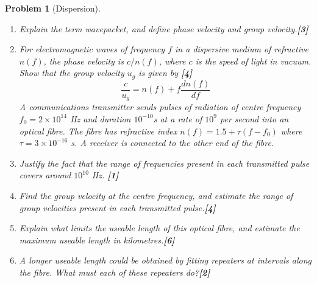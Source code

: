 \documentclass[a4paper]{article}
\theoremstyle{new}
\newtheorem{qns}{Problem}[subsection]
\begin{document}
\newpage
\begin{qns}[Dispersion]\leavevmode
\begin{enumerate}[label=(\roman*)]
\item Explain the term wavepacket, and define phase velocity and group velocity.\hfill\textbf{[3]}
\item For electromagnetic waves of frequency $f$ in a dispersive medium of refractive $n(f)$, the phase velocity is $c/n(f)$, where $c$ is the speed of light in vacuum. Show that the group velocity $u_g$ is given by \hfill\textbf{[4]}
$$\frac{c}{u_g}=n(f)+f\frac{dn(f)}{df}$$
A communications transmitter sends pulses of radiation of centre frequency $f_0=2\times10^{14}$ Hz and duration $10^{-10}$s at a rate of $10^9$ per second into an optical fibre. The fibre has refractive index $n(f)=1.5+\tau(f-f_0)$ where $\tau=3\times10^{-16}$ s. A receiver is connected to the other end of the fibre.
\item Justify the fact that the range of frequencies present in each transmitted pulse covers around $10^{10}$ Hz. \hfill\textbf{[1]}
\item Find the group velocity at the centre frequency, and estimate the range of group velocities present in each transmitted pulse.\hfill\textbf{[4]}
\item Explain what limits the useable length of this optical fibre, and estimate the maximum useable length in kilometres.\hfill\textbf{[6]}
\item A longer useable length could be obtained by fitting repeaters at intervals along the fibre. What must each of these repeaters do?\hfill\textbf{[2]}
\end{enumerate}
\end{qns}
\end{document}
